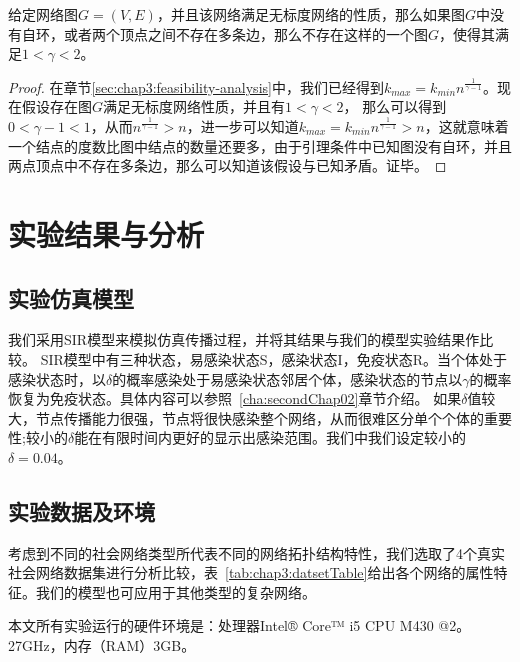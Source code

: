 \begin{lemma}
\label{lemma:noexist-gamma-le2}
给定网络图$G=(V, E)$，并且该网络满足无标度网络的性质，那么如果图$G$中没有自环，或者两个顶点之间不存在多条边，那么不存在这样的一个图$G$，使得其满足$1 < \gamma < 2$。
\end{lemma}
\begin{proof}
在章节\ref{sec:chap3:feasibility-analysis}中，我们已经得到$k_{max} = k_{min}n^{\frac{1}{\gamma-1}}$。现在假设存在图$G$满足无标度网络性质，并且有$1 < \gamma < 2$， 那么可以得到$0 < \gamma-1 < 1$，从而$n^{\frac{1}{\gamma-1}} > n$，进一步可以知道$k_{max} = k_{min}n^{\frac{1}{\gamma-1}} > n$，这就意味着一个结点的度数比图中结点的数量还要多，由于引理条件中已知图没有自环，并且两点顶点中不存在多条边，那么可以知道该假设与已知矛盾。证毕。
\end{proof}

\section{实验结果与分析}
\subsection{实验仿真模型}
我们采用SIR模型\cite{kermack1927contribution,diekmann1990definition,hethcote2000mathematics,bernoulli2004attempt}来模拟仿真传播过程，并将其结果与我们的模型实验结果作比较。
SIR模型中有三种状态，易感染状态S，感染状态I，免疫状态R。当个体处于感染状态时，以$\delta$的概率感染处于易感染状态邻居个体，感染状态的节点以$\gamma$的概率恢复为免疫状态。具体内容可以参照~\ref{cha:secondChap02}章节介绍。
如果$\delta$值较大，节点传播能力很强，节点将很快感染整个网络，从而很难区分单个个体的重要性;较小的$\delta$能在有限时间内更好的显示出感染范围。我们中我们设定较小的$\delta =0.04$。
\subsection{实验数据及环境}
考虑到不同的社会网络类型所代表不同的网络拓扑结构特性，我们选取了4个真实社会网络数据集进行分析比较，表~\ref{tab:chap3:datsetTable}给出各个网络的属性特征。我们的模型也可应用于其他类型的复杂网络。

本文所有实验运行的硬件环境是：处理器Intel® Core™ i5 CPU M430 @2。27GHz，内存（RAM）3GB。

